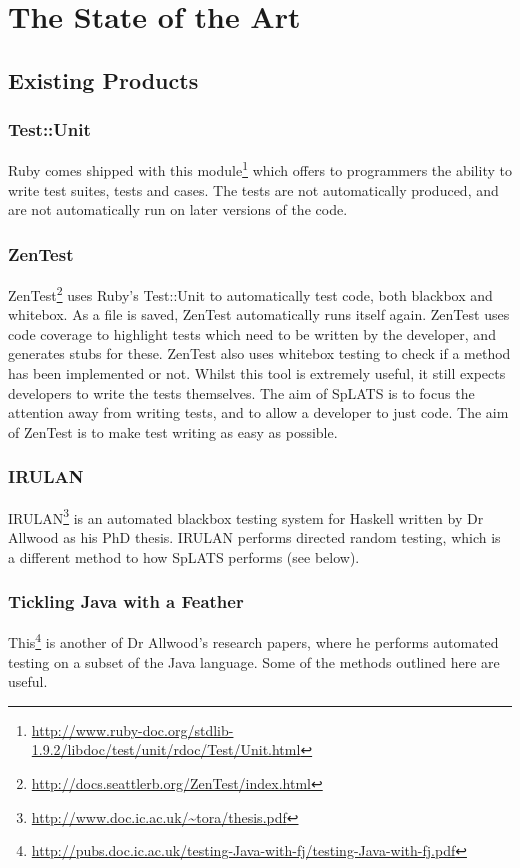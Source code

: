 \chapter{The State of the Art}

\section{Existing Products}

  \subsection{Test::Unit}
    Ruby comes shipped with this module\footnote{\url{http://www.ruby-doc.org/stdlib-1.9.2/libdoc/test/unit/rdoc/Test/Unit.html}} which offers to programmers the ability to write test suites, tests and cases.
    The tests are not automatically produced, and are not automatically run on later versions of the code.

  \subsection{ZenTest}
    ZenTest\footnote{\url{http://docs.seattlerb.org/ZenTest/index.html}} uses Ruby's Test::Unit to automatically test code, both blackbox and whitebox.
    As a file is saved, ZenTest automatically runs itself again.
    ZenTest uses code coverage to highlight tests which need to be written by the developer, and generates stubs for these.
    ZenTest also uses whitebox testing to check if a method has been implemented or not.
    Whilst this tool is extremely useful, it still expects developers to write the tests themselves.
    The aim of SpLATS is to focus the attention away from writing tests, and to allow a developer to just code.
    The aim of ZenTest is to make test writing as easy as possible.

  \subsection{IRULAN}
    IRULAN\footnote{\url{http://www.doc.ic.ac.uk/~tora/thesis.pdf}} is an automated blackbox testing system for Haskell written by Dr Allwood as his PhD thesis.
    IRULAN performs directed random testing, which is a different method to how SpLATS performs (see below).

  \subsection{Tickling Java with a Feather}
    This\footnote{\url{http://pubs.doc.ic.ac.uk/testing-Java-with-fj/testing-Java-with-fj.pdf}} is another of Dr Allwood's research papers, where he performs automated testing on a subset of the Java language.
    Some of the methods outlined here are useful.


